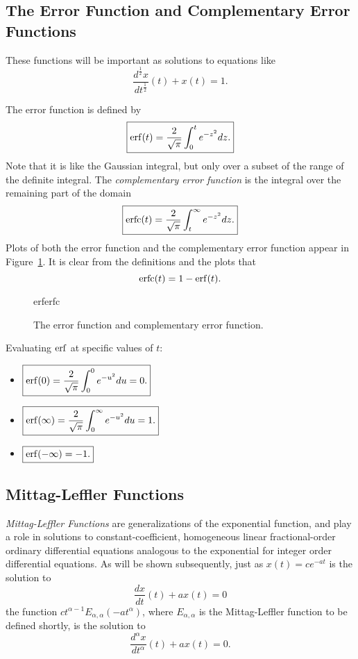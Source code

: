 \subsection{The Error Function and Complementary Error Functions}
These functions will be important as solutions to equations like
\begin{equation*}
  \frac{d^\frac{1}{2} x}{d t^\frac{1}{2}}(t) + x(t) = 1.
\end{equation*}

The error function is defined by
\begin{equation}
  \boxed{ \operatorname{erf}(t) = \frac{2}{\sqrt{\pi}} \int_0^t e^{-z^2} dz. }
  \label{eq:erf}
\end{equation}
Note that it is like the Gaussian integral, but only over a subset of the range of the definite integral. The \emph{complementary error function} is the integral over the remaining part of the domain
\begin{equation}
  \boxed{ \operatorname{erfc}(t)  = \frac{2}{\sqrt{\pi}} \int_t^\infty e^{-z^2} dz. }
  \label{eq:erfc}
\end{equation}
Plots of both the error function and the complementary error function appear in Figure~\ref{fig:erferfc}. It is clear from the definitions and the plots that
\begin{equation}
  \operatorname{erfc}(t) = 1 - \operatorname{erf}(t).
  \label{eq:erfs}
\end{equation}

\begin{figure}
  \centering
  {erferfc}
  \caption{The error function and complementary error function.}
  \label{fig:erferfc}
\end{figure}

Evaluating $\operatorname{erf}$ at specific values of $t$:
\begin{itemize}
  \item $ \boxed{ \operatorname{erf}(0) = \frac{2}{\sqrt{ \pi} } \int_0^0 e^{-u^2} du = 0. }$
  \item $ \boxed{ \operatorname{erf}(\infty) = \frac{2}{\sqrt{ \pi }} \int_0^\infty e^{-u^2} du = 1. }$
  \item $ \boxed{ \operatorname{erf}(-\infty) = -1. }$
\end{itemize}

\subsection{Mittag-Leffler Functions}
\emph{Mittag-Leffler Functions} are generalizations of the exponential function, and play a role in solutions to constant-coefficient, homogeneous linear fractional-order ordinary differential equations analogous to the exponential for integer order differential equations. As will be shown subsequently, just as $x(t) = c e^{-a t}$ is the solution to
\begin{equation*}
  \frac{dx}{dt}(t) + a x(t) = 0
\end{equation*}
the function $c t^{\alpha - 1} E_{\alpha,\alpha}\left(-a t^\alpha\right)$, where $E_{\alpha,\alpha}$ is the Mittag-Leffler function to be defined shortly, is the solution to 
\begin{equation*}
  \frac{d^\alpha x}{dt^\alpha}(t) + a x(t) = 0.
\end{equation*}

